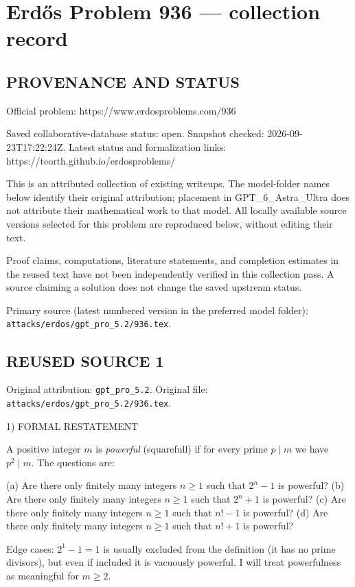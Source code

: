 \section*{Erd\H{o}s Problem 936 --- collection record}

\subsection*{PROVENANCE AND STATUS}
Official problem: https://www.erdosproblems.com/936

Saved collaborative-database status: open.
Snapshot checked: 2026-09-23T17:22:24Z.
Latest status and formalization links: https://teorth.github.io/erdosproblems/

This is an attributed collection of existing writeups. The model-folder names below identify their original attribution; placement in GPT\_6\_Astra\_Ultra does not attribute their mathematical work to that model. All locally available source versions selected for this problem are reproduced below, without editing their text.

Proof claims, computations, literature statements, and completion estimates in the reused text have not been independently verified in this collection pass. A source claiming a solution does not change the saved upstream status.

Primary source (latest numbered version in the preferred model folder): \texttt{attacks/erdos/gpt\_pro\_5.2/936.tex}.

\subsection*{REUSED SOURCE 1}
Original attribution: \texttt{gpt\_pro\_5.2}.
Original file: \texttt{attacks/erdos/gpt\_pro\_5.2/936.tex}.


1) FORMAL RESTATEMENT

A positive integer \(m\) is \emph{powerful} (squarefull) if for every prime \(p\mid m\) we have \(p^2\mid m\).
The questions are:

(a) Are there only finitely many integers \(n\ge 1\) such that \(2^n-1\) is powerful?
(b) Are there only finitely many integers \(n\ge 1\) such that \(2^n+1\) is powerful?
(c) Are there only finitely many integers \(n\ge 1\) such that \(n!-1\) is powerful?
(d) Are there only finitely many integers \(n\ge 1\) such that \(n!+1\) is powerful?

Edge cases: \(2^1-1=1\) is usually excluded from the definition (it has no prime divisors), but even if included it is vacuously powerful. I will treat powerfulness as meaningful for \(m\ge 2\).

